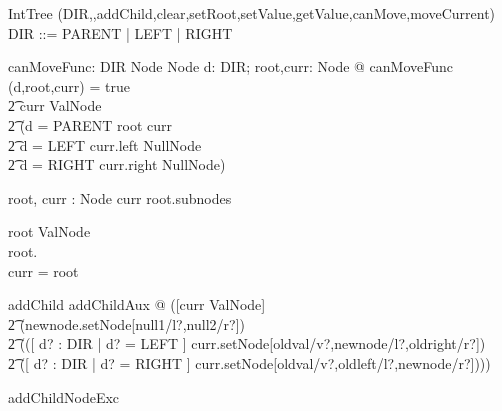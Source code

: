 \documentclass{article}
\begin{document}
\begin{class}{IntTree}
\visibility (DIR,\Init,addChild,clear,setRoot,setValue,getValue,canMove,moveCurrent) \\
DIR ::= PARENT | LEFT | RIGHT\classbreak
\begin{axdef}
	canMoveFunc: DIR \cross Node \cross Node \fun \bool
\where
	\forall d: DIR; root,curr: Node @ canMoveFunc (d,root,curr) = true \iff \\
                \t2 curr \in ValNode \land\\
		\t2 (d = PARENT \land root \neq curr \lor \\
		\t2 d = LEFT \land curr.left \notin NullNode \lor \\
		\t2 d = RIGHT \land curr.right \notin NullNode)
\end{axdef}\classbreak
\begin{state}
	root, curr : Node
\where
	curr \in root.subnodes
\end{state}\classbreak
\begin{init}
	root \in ValNode \\
        root.\Init \\
        curr = root
\end{init}\classbreak
{}\classbreak
addChild \sdef addChildAux @ ([curr \in ValNode] \land\\
	\t2 (newnode.setNode[null1/l?,null2/r?]) \land \\
	\t2 (([ d? : DIR | d? = LEFT ]
		\land curr.setNode[oldval/v?,newnode/l?,oldright/r?]) \gch \\
	\t2 ([ d? : DIR | d? = RIGHT ]
		\land curr.setNode[oldval/v?,oldleft/l?,newnode/r?])))\\
\begin{op}{addChildNodeExc}

\end{op}
\end{class}
\end{document}
